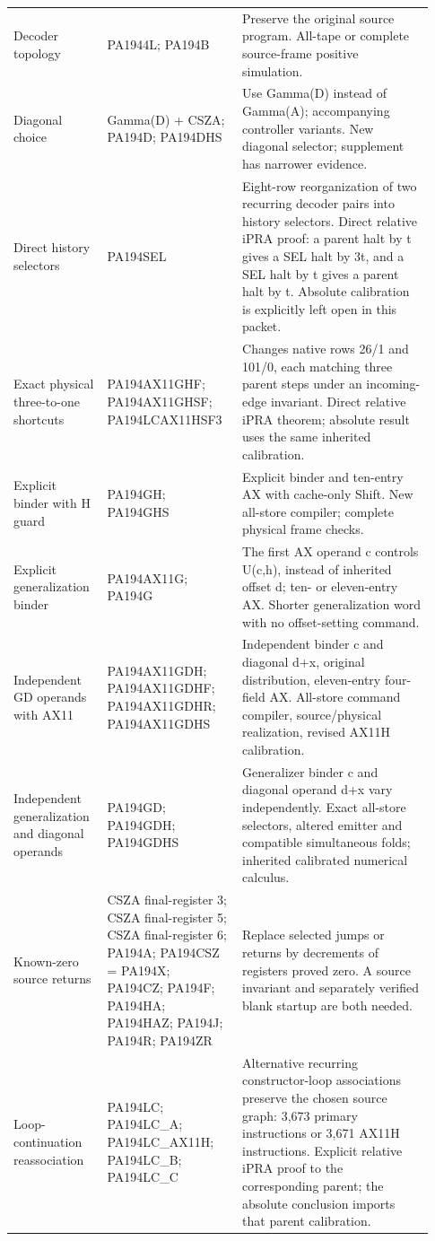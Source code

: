 \begin{longtable}{p{0.20\linewidth}p{0.30\linewidth}p{0.43\linewidth}}
Decoder topology & PA1944L; PA194B & Preserve the original source program. All-tape or complete source-frame positive simulation.\\[4pt]
Diagonal choice & Gamma(D) + CSZA; PA194D; PA194DHS & Use Gamma(D) instead of Gamma(A); accompanying controller variants. New diagonal selector; supplement has narrower evidence.\\[4pt]
Direct history selectors & PA194SEL & Eight-row reorganization of two recurring decoder pairs into history selectors. Direct relative iPRA proof: a parent halt by t gives a SEL halt by 3t, and a SEL halt by t gives a parent halt by t. Absolute calibration is explicitly left open in this packet.\\[4pt]
Exact physical three-to-one shortcuts & PA194AX11GHF; PA194AX11GHSF; PA194LCAX11HSF3 & Changes native rows 26/1 and 101/0, each matching three parent steps under an incoming-edge invariant. Direct relative iPRA theorem; absolute result uses the same inherited calibration.\\[4pt]
Explicit binder with H guard & PA194GH; PA194GHS & Explicit binder and ten-entry AX with cache-only Shift. New all-store compiler; complete physical frame checks.\\[4pt]
Explicit generalization binder & PA194AX11G; PA194G & The first AX operand c controls U(c,h), instead of inherited offset d; ten- or eleven-entry AX. Shorter generalization word with no offset-setting command.\\[4pt]
Independent GD operands with AX11 & PA194AX11GDH; PA194AX11GDHF; PA194AX11GDHR; PA194AX11GDHS & Independent binder c and diagonal d+x, original distribution, eleven-entry four-field AX. All-store command compiler, source/physical realization, revised AX11H calibration.\\[4pt]
Independent generalization and diagonal operands & PA194GD; PA194GDH; PA194GDHS & Generalizer binder c and diagonal operand d+x vary independently. Exact all-store selectors, altered emitter and compatible simultaneous folds; inherited calibrated numerical calculus.\\[4pt]
Known-zero source returns & CSZA final-register 3; CSZA final-register 5; CSZA final-register 6; PA194A; PA194CSZ = PA194X; PA194CZ; PA194F; PA194HA; PA194HAZ; PA194J; PA194R; PA194ZR & Replace selected jumps or returns by decrements of registers proved zero. A source invariant and separately verified blank startup are both needed.\\[4pt]
Loop-continuation reassociation & PA194LC; PA194LC\_A; PA194LC\_AX11H; PA194LC\_B; PA194LC\_C & Alternative recurring constructor-loop associations preserve the chosen source graph: 3,673 primary instructions or 3,671 AX11H instructions. Explicit relative iPRA proof to the corresponding parent; the absolute conclusion imports that parent calibration.\\[4pt]

\end{longtable}

